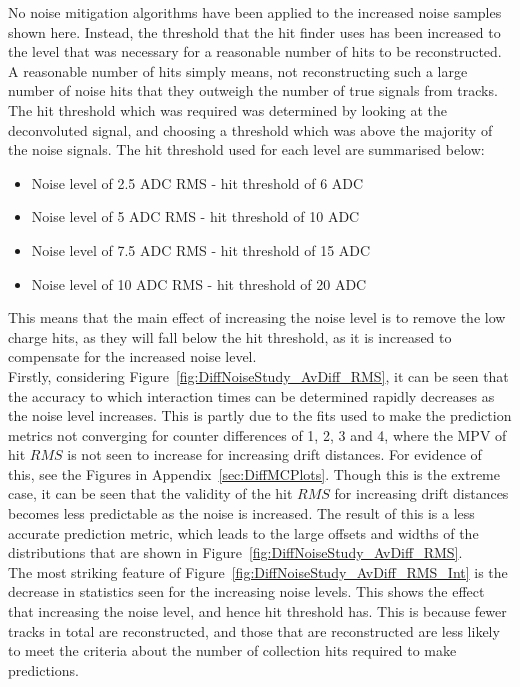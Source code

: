 No noise mitigation algorithms have been applied to the increased noise samples shown here. Instead, the threshold that the hit finder uses has been increased to the level that was necessary for a reasonable number of hits to be reconstructed. A reasonable number of hits simply means, not reconstructing such a large number of noise hits that they outweigh the number of true signals from tracks. The hit threshold which was required was determined by looking at the deconvoluted signal, and choosing a threshold which was above the majority of the noise signals. The hit threshold used for each level are summarised below:
\begin{itemize}
\item Noise level of 2.5 ADC RMS - hit threshold of 6 ADC
\item Noise level of 5 ADC RMS - hit threshold of 10 ADC
\item Noise level of 7.5 ADC RMS - hit threshold of 15 ADC
\item Noise level of 10 ADC RMS - hit threshold of 20 ADC
\end{itemize}
This means that the main effect of increasing the noise level is to remove the low charge hits, as they will fall below the hit threshold, as it is increased to compensate for the increased noise level. \\

Firstly, considering Figure~\ref{fig:DiffNoiseStudy_AvDiff_RMS}, it can be seen that the accuracy to which interaction times can be determined rapidly decreases as the noise level increases. This is partly due to the fits used to make the prediction metrics not converging for counter differences of 1, 2, 3 and 4, where the MPV of hit $RMS$ is not seen to increase for increasing drift distances. For evidence of this, see the Figures in Appendix~\ref{sec:DiffMCPlots}. Though this is the extreme case, it can be seen that the validity of the hit $RMS$ for increasing drift distances becomes less predictable as the noise is increased. The result of this is a less accurate prediction metric, which leads to the large offsets and widths of the distributions that are shown in Figure~\ref{fig:DiffNoiseStudy_AvDiff_RMS}.\\

The most striking feature of Figure~\ref{fig:DiffNoiseStudy_AvDiff_RMS_Int} is the decrease in statistics seen for the increasing noise levels. This shows the effect that increasing the noise level, and hence hit threshold has. This is because fewer tracks in total are reconstructed, and those that are reconstructed are less likely to meet the criteria about the number of collection hits required to make predictions. \\

